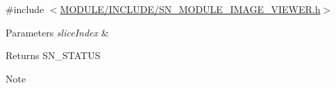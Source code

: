 {\ttfamily \#include $<$\hyperlink{SN__MODULE__IMAGE__VIEWER_8h}{M\+O\+D\+U\+L\+E/\+I\+N\+C\+L\+U\+D\+E/\+S\+N\+\_\+\+M\+O\+D\+U\+L\+E\+\_\+\+I\+M\+A\+G\+E\+\_\+\+V\+I\+E\+W\+E\+R.\+h}$>$}


\begin{DoxyParams}{Parameters}
{\em slice\+Index} & \\
\hline
\end{DoxyParams}
\begin{DoxyReturn}{Returns}
S\+N\+\_\+\+S\+T\+A\+T\+US 
\end{DoxyReturn}
\begin{DoxyNote}{Note}

\end{DoxyNote}
